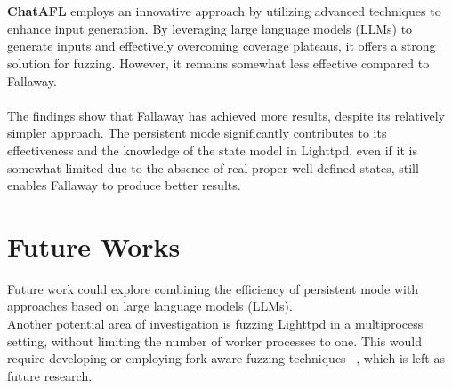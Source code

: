 \\\\\textbf{ChatAFL} employs an innovative approach by utilizing advanced techniques to enhance input generation. By leveraging large language models (LLMs) to generate inputs and effectively overcoming coverage plateaus, it offers a strong solution for fuzzing. However, it remains somewhat less effective compared to Fallaway.
\\\\The findings show that Fallaway has achieved more results, despite its relatively simpler approach. The persistent mode significantly contributes to its effectiveness and the knowledge of the state model in Lighttpd, even if it is somewhat limited due to the absence of real proper well-defined states, still enables Fallaway to produce better results.

\section{Future Works}
Future work could explore combining the efficiency of persistent mode with approaches based on large language models (LLMs).
\\Another potential area of investigation is fuzzing Lighttpd in a multiprocess setting, without limiting the number of worker processes to one. This would require developing or employing fork-aware fuzzing techniques ~\cite{forkfuzz,icissp23}, which is left as future research.

